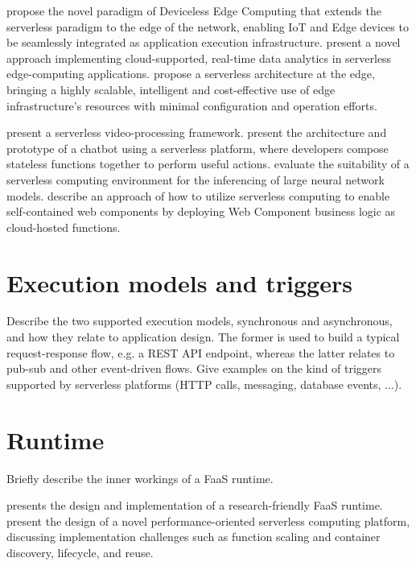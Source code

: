 \documentclass[utf8,english]{gradu3}
\begin{document}
\textcite{glikson17devicelessedge} propose the novel paradigm of Deviceless Edge Computing that extends the serverless paradigm to the edge of the network, enabling IoT and Edge devices to be seamlessly integrated as application execution infrastructure. \textcite{nastic17analyticsedge} present a novel approach implementing cloud-supported, real-time data analytics in serverless edge-computing applications. \textcite{baresi17edgecomputing} propose a serverless architecture at the edge, bringing a highly scalable, intelligent and cost-effective use of edge infrastructure’s resources with minimal configuration and operation efforts.

\textcite{fouladi2017encoding} present a serverless video-processing framework. \textcite{yan16chatbot} present the architecture and prototype of a chatbot using a serverless platform, where developers compose stateless functions together to perform useful actions. \textcite{ishakian17neural} evaluate the suitability of a serverless computing environment for the inferencing of large neural network models. \textcite{ast17webcomponent} describe an approach of how to utilize serverless computing to enable self-contained web components by deploying Web Component business logic as cloud-hosted functions.

\section{Execution models and triggers}

Describe the two supported execution models, synchronous and asynchronous, and how they relate to application design. The former is used to build a typical request-response flow, e.g. a REST API endpoint, whereas the latter relates to pub-sub and other event-driven flows. Give examples on the kind of triggers supported by serverless platforms (HTTP calls, messaging, database events, ...).

\section{Runtime}

Briefly describe the inner workings of a FaaS runtime.

\textcite{spillner17snafu} presents the design and implementation of a research-friendly FaaS runtime. \textcite{mcgrath17implement} present the design of a novel performance-oriented serverless computing platform, discussing implementation challenges such as function scaling and container discovery, lifecycle, and reuse.
\end{document}
